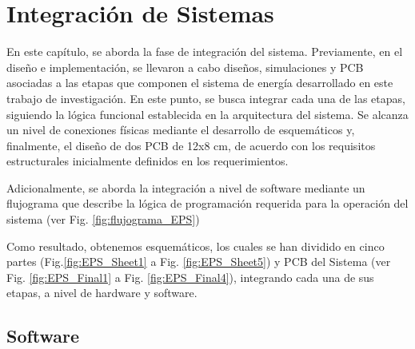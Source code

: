 \chapter{Integración de Sistemas}
En este capítulo, se aborda la fase de integración del sistema. Previamente, en el diseño e implementación, se llevaron a cabo diseños, simulaciones y PCB asociadas a las etapas que componen el sistema de energía desarrollado en este trabajo de investigación. En este punto, se busca integrar cada una de las etapas, siguiendo la lógica funcional establecida en la arquitectura del sistema. Se alcanza un nivel de conexiones físicas mediante el desarrollo de esquemáticos y, finalmente, el diseño de dos PCB de 12x8 cm, de acuerdo con los requisitos estructurales inicialmente definidos en los requerimientos.

\hspace{1.27cm}Adicionalmente, se aborda la integración a nivel de software mediante un flujograma que describe la lógica de programación requerida para la operación del sistema (ver Fig. \ref{fig:flujograma_EPS})

\hspace{1.27cm}Como resultado, obtenemos esquemáticos, los cuales se han dividido en cinco partes (Fig.\ref{fig:EPS_Sheet1} a Fig. \ref{fig:EPS_Sheet5}) y PCB del Sistema (ver Fig. \ref{fig:EPS_Final1} a Fig. \ref{fig:EPS_Final4}), integrando cada una de sus etapas, a nivel de hardware y software.


\newpage


\section{Software}

